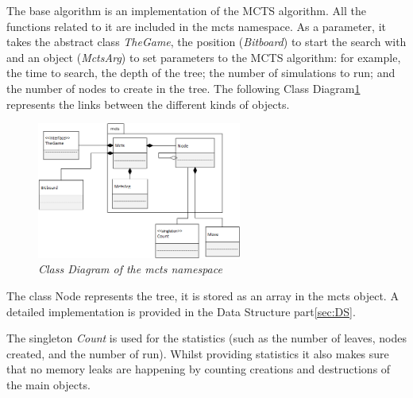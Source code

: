 The base algorithm is an implementation of the MCTS algorithm. All the functions related to it are included in the mcts namespace. As a parameter, it takes the abstract class \textit{TheGame}, the position (\textit{Bitboard}) to start the search with and an object (\textit{MctsArg}) to set parameters to the MCTS algorithm: for example, the time to search, the depth of the tree; the number of simulations to run; and the number of nodes to create in the tree.
The following Class Diagram\ref{fig:MCTSClassDiagram} represents the links between the different kinds of objects.
\begin{figure}[H] 
\centerline{\includegraphics[width=0.6\textwidth]{Base_Algorithm/Img/MCTSsimple.png}}
\caption{\label{fig:MCTSClassDiagram}\textit{Class Diagram of the mcts namespace}}
\end{figure}
The class Node represents the tree, it is stored as an array in the mcts object. A detailed implementation is provided in the Data Structure part\ref{sec:DS}.

The singleton \textit{Count} is used for the statistics (such as the number of leaves, nodes created, and the number of run). Whilst providing statistics it also makes sure that no  memory leaks are happening by counting creations and destructions of the main objects.

